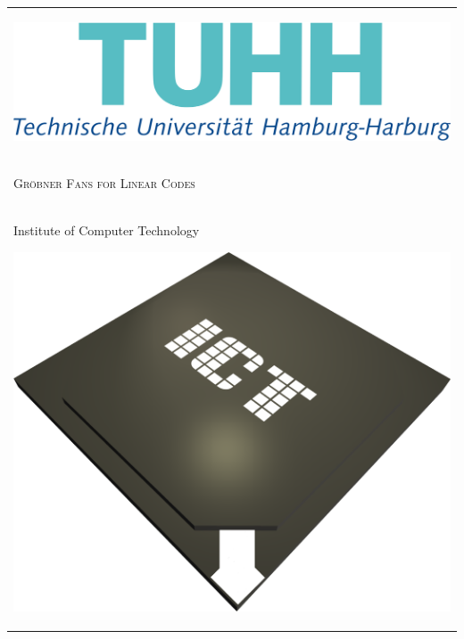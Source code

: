 
\begin{center}
\begin{tabular}{p{\textwidth}}


\begin{center}
\includegraphics[scale=0.15]{figures/tuhh.png}
\end{center}


\\

\begin{center}
\LARGE{\textsc{
Gr\"obner Fans for Linear Codes
}}
\end{center}

\\


\begin{center}
\large{Institute of Computer Technology}
\end{center}


\begin{center}
\includegraphics[scale=0.2]{figures/ictlogo.png}
\end{center}


\end{tabular}
\end{center}
